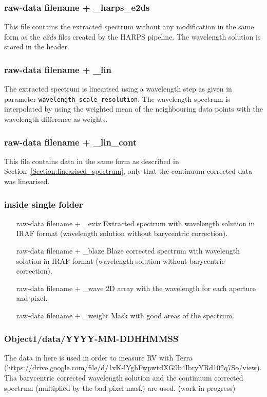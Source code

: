 \documentclass[10pt,a4paper]{article}
\begin{document}
\subsubsection*{raw-data filename + \_harps\_e2ds}
This file contains the extracted spectrum without any modification in the same form as the \textit{e2ds} files created by the HARPS pipeline. The wavelength solution is stored in the header.

\subsubsection*{raw-data filename + \_lin}
\label{Section:linearised_spectrum}
The extracted spectrum is linearised using a wavelength step as given in parameter \verb|wavelength_scale_resolution|. The wavelength spectrum is interpolated by using the weighted mean of the neighbouring data points with the wavelength difference as weights.

\subsubsection*{raw-data filename + \_lin\_cont}
This file contains data in the same form as described in Section~\ref{Section:linearised_spectrum}, only that the continuum corrected data was linearised.

\subsubsection*{inside single folder}
\begin{itemize}
 \item[raw-data filename + \_extr] Extracted spectrum with wavelength solution in IRAF format (wavelength solution without barycentric correction).
 \item[raw-data filename + \_blaze] Blaze corrected spectrum with wavelength solution in IRAF format (wavelength solution without barycentric correction).
 \item[raw-data filename + \_wave] 2D array with the wavelength for each aperture and pixel.
 \item[raw-data filename + \_weight] Mask with good areas of the spectrum.
\end{itemize}

\subsubsection*{Object1/data/YYYY-MM-DDHHMMSS}
The data in here is used in order to measure RV with Terra (\url{https://drive.google.com/file/d/1xK-lYghFwpwtdXG9b4IbryYRd102q7So/view}). Tha barycentric corrected wavelength solution and the continuum corrected spectrum (multiplied by the bad-pixel mask) are used. 
(work in progress)
\end{document}
